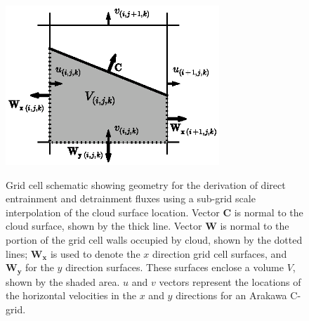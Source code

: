 \documentclass[12pt]{article}
\begin{document}
\begin{figure}[t]
  \noindent
  \includegraphics[width=19pc,angle=0]{./figures/gridcell_schematic}\\
  \caption{Grid cell schematic showing geometry for the derivation of direct 
entrainment and detrainment fluxes using a sub-grid scale interpolation of the 
cloud surface location.  Vector $\mathbf{C}$ is normal to the cloud surface, 
shown by the thick line.  Vector $\mathbf{W}$ is normal to the portion of the 
grid cell walls occupied by cloud, shown by the dotted lines; $\mathbf{W_x}$ is 
used to denote the $x$ direction grid cell surfaces, and $\mathbf{W_y}$ for the 
$y$ direction surfaces.  These surfaces enclose a volume $V$, shown by the 
shaded area.  $u$ and $v$ vectors represent the locations of the horizontal 
velocities in the $x$ and $y$ directions for an Arakawa C-grid.}
  \label{fig:gridcell_schematic}
\end{figure}
\end{document}
